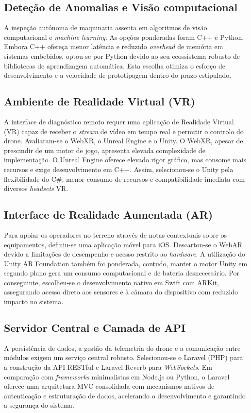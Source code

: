 \documentclass[conference,a4paper]{IEEEtran}
\begin{document}
\subsection{Deteção de Anomalias e Visão computacional}
A inspeção autónoma de maquinaria assenta em algoritmos de visão computacional e \textit{machine learning}. As opções ponderadas foram C++ e Python. Embora C++ ofereça menor latência e reduzido \textit{overhead} de memória em sistemas embebidos, optou-se por Python devido ao seu ecossistema robusto de bibliotecas de aprendizagem automática. Esta escolha otimiza o esforço de desenvolvimento e a velocidade de prototipagem dentro do prazo estipulado.

\subsection{Ambiente de Realidade Virtual (VR)}
A interface de diagnóstico remoto requer uma aplicação de Realidade Virtual (VR) capaz de receber o \textit{stream} de vídeo em tempo real e permitir o controlo do drone. Avaliaram-se o WebXR, o Unreal Engine e o Unity. O WebXR, apesar de prescindir de um motor de jogo, apresenta elevada complexidade de implementação. O Unreal Engine oferece elevado rigor gráfico, mas consome mais recursos e exige desenvolvimento em C++. Assim, selecionou-se o Unity pela flexibilidade do C\#, menor consumo de recursos e compatibilidade imediata com diversos \textit{headsets} VR.

\subsection{Interface de Realidade Aumentada (AR)}
Para apoiar os operadores no terreno através de notas contextuais sobre os equipamentos, definiu-se uma aplicação móvel para iOS. Descartou-se o WebAR devido a limitações de desempenho e acesso restrito ao \textit{hardware}. A utilização do Unity AR Foundation também foi ponderada, contudo, manter o motor Unity em segundo plano gera um consumo computacional e de bateria desnecessário. Por conseguinte, escolheu-se o desenvolvimento nativo em Swift com ARKit, assegurando acesso direto aos sensores e à câmara do dispositivo com reduzido impacto no sistema.

\subsection{Servidor Central e Camada de API}
A persistência de dados, a gestão da telemetria do drone e a comunicação entre módulos exigem um serviço central robusto. Selecionou-se o Laravel (PHP) para a construção da API RESTful e Laravel Reverb para \textit{WebSockets}. Em comparação com \textit{frameworks} minimalistas em Node.js ou Python, o Laravel oferece uma arquitetura MVC consolidada com mecanismos nativos de autenticação e estruturação de dados, acelerando o desenvolvimento e garantindo a segurança do sistema.
\end{document}
